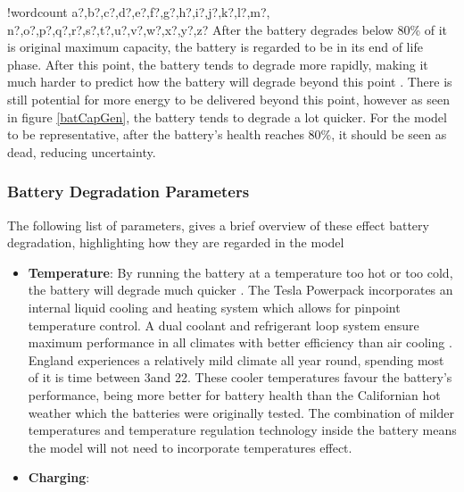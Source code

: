 \documentclass[fontsize=9.5pt]{extarticle}
\numberwithin{figure}{section} %
\newcounter{words}
\newenvironment{counted}{%
  \setcounter{words}{0}
  \SearchList!{wordcount}{\stepcounter{words}}
    {a?,b?,c?,d?,e?,f?,g?,h?,i?,j?,k?,l?,m?,
    n?,o?,p?,q?,r?,s?,t?,u?,v?,w?,x?,y?,z?}
  \UndoBoundary{'}
  \SearchOrder{p;}}{%
  \StopSearching}
\begin{document}
\begin{counted}
After the battery degrades below 80\% of it is original maximum
capacity, the battery is regarded to be in its end of life phase. After
this point, the battery tends to degrade more rapidly, making it much
harder to predict how the battery will degrade beyond this point
\cite{spotnitz2003simulation}. There is still potential for more energy
to be delivered beyond this point, however as seen in figure
\ref{batCapGen}, the battery tends to degrade a lot quicker. For the
model to be representative, after the battery's health reaches 80\%, it
should be seen as dead, reducing uncertainty.

\subsubsection{Battery Degradation
Parameters}\label{battery-degradation-parameters}

The following list of parameters, gives a brief overview of these effect
battery degradation, highlighting how they are regarded in the model

\begin{itemize}
\item
  \textbf{Temperature}: By running the battery at a temperature too hot
  or too cold, the battery will degrade much quicker
  \cite{rong2006analytical}. The Tesla Powerpack incorporates an
  internal liquid cooling and heating system which allows for pinpoint
  temperature control. A dual coolant and refrigerant loop system ensure
  maximum performance in all climates with better efficiency than air
  cooling \cite{Powerpac95:online}. England experiences a relatively
  mild climate all year round, spending most of it is time between
  3\degree and 22\degree \cite{WeatherA0:online}. These cooler
  temperatures favour the battery's performance, being more better for
  battery health than the Californian hot weather which the batteries
  were originally tested. The combination of milder temperatures and
  temperature regulation technology inside the battery means the model
  will not need to incorporate temperatures effect.
\item
  \textbf{Charging}:


\end{itemize}
\end{counted}
\end{document}
